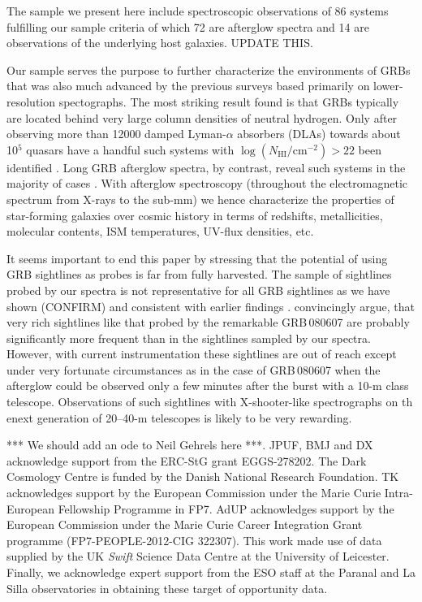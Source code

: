 \documentclass{aa}    %
\begin{document}
The sample we present here include spectroscopic observations of 86 
systems fulfilling our sample criteria of which 72 are afterglow spectra 
and 14 are observations of the underlying host galaxies. 
UPDATE THIS.

Our sample serves the purpose to further characterize the environments 
of GRBs that was also much advanced by the previous surveys based primarily on 
lower-resolution spectographs. The most striking result found is that GRBs
typically are located behind very large column densities of neutral hydrogen.
Only after observing more than 12000 damped Lyman-$\alpha$ absorbers (DLAs)
towards about 10$^5$ quasars have a handful such systems with
$\log({N_\mathrm{HI}/\mathrm{cm^{-2}}}) > 22$ been identified
\citep[e.g., five in][]{Noterdaeme2012}. Long GRB afterglow spectra, by contrast, 
reveal such
systems in the majority of cases \citep[][and this work]{Jakobsson2006, Fynbo2009}. 
With afterglow spectroscopy (throughout the electromagnetic
spectrum from X-rays to the sub-mm) we hence characterize the properties of
star-forming galaxies over cosmic history in terms of  redshifts, metallicities,
molecular contents, ISM temperatures, UV-flux densities, etc.

It seems important to end this paper by stressing that the potential of 
using GRB sightlines as probes is far from fully harvested. The sample of
sightlines probed by our spectra is not representative for all GRB 
sightlines as we have shown (CONFIRM) and consistent with earlier findings
\citep[e.g.,][]{Fynbo2009}. \cite{Kruhler2013} convincingly argue, that 
very rich sightlines like that probed by the remarkable GRB\,080607 
\citep{Prochaska09} are probably significantly more frequent than in the sightlines 
sampled by our spectra. However, with current instrumentation these sightlines are
out of reach except under very fortunate circumstances as in the case of 
GRB\,080607 when the afterglow could be observed only a few minutes after the 
burst with a 10-m class telescope. Observations of such sightlines with 
X-shooter-like spectrographs on th enext generation of 20--40-m telescopes
is likely to be very rewarding. 

\begin{acknowledgements}
*** We should add an ode to Neil Gehrels here ***.
JPUF, BMJ and DX acknowledge support from the ERC-StG grant EGGS-278202.  The
Dark Cosmology Centre is funded by the Danish National Research Foundation.  TK
acknowledges support by the European Commission under the Marie Curie
Intra-European Fellowship Programme in FP7.  AdUP acknowledges support by the
European Commission under the Marie Curie Career Integration Grant programme
(FP7-PEOPLE-2012-CIG 322307).  This work made use of data supplied by the UK
{\it Swift} Science Data Centre at the University of Leicester.  Finally, we
acknowledge expert support from the ESO staff at the Paranal and La Silla
observatories in obtaining these target of opportunity data.

\end{acknowledgements}
\end{document}
